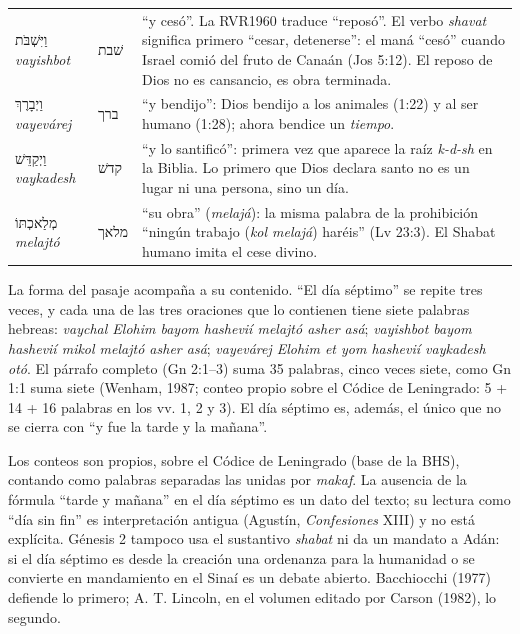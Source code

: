\documentclass[11pt,letterpaper]{article}
\newcommand{\heb}[1]{\mbox{\foreignlanguage{hebrew}{#1}}}
\begin{document}
\begin{filologia}[Gn 2:2--3]
\begin{tabular}{@{}L{3.1cm}L{1.5cm}L{10.2cm}@{}}
\heb{וַיִּשְׁבֹּת} \emph{vayishbot} & \heb{שׁבת} & ``y cesó''. La RVR1960 traduce ``reposó''. El verbo \emph{shavat} significa primero ``cesar, detenerse'': el maná ``cesó'' cuando Israel comió del fruto de Canaán (Jos 5:12). El reposo de Dios no es cansancio, es obra terminada. \\[2pt]
\heb{וַיְבָרֶךְ} \emph{vayevárej} & \heb{ברך} & ``y bendijo'': Dios bendijo a los animales (1:22) y al ser humano (1:28); ahora bendice un \emph{tiempo}. \\[2pt]
\heb{וַיְקַדֵּשׁ} \emph{vaykadesh} & \heb{קדשׁ} & ``y lo santificó'': primera vez que aparece la raíz \emph{k-d-sh} en la Biblia. Lo primero que Dios declara santo no es un lugar ni una persona, sino un día. \\[2pt]
\heb{מְלַאכְתּוֹ} \emph{melajtó} & \heb{מלאך} & ``su obra'' (\emph{melajá}): la misma palabra de la prohibición ``ningún trabajo (\emph{kol melajá}) haréis'' (Lv 23:3). El Shabat humano imita el cese divino. \\
\end{tabular}
\end{filologia}

La forma del pasaje acompaña a su contenido. ``El día séptimo'' se repite tres veces, y cada una de las tres oraciones que lo contienen tiene siete palabras hebreas: \emph{vaychal Elohim bayom hashevií melajtó asher asá}; \emph{vayishbot bayom hashevií mikol melajtó asher asá}; \emph{vayevárej Elohim et yom hashevií vaykadesh otó}. El párrafo completo (Gn 2:1--3) suma 35 palabras, cinco veces siete, como Gn 1:1 suma siete (Wenham, 1987; conteo propio sobre el Códice de Leningrado: 5 + 14 + 16 palabras en los vv. 1, 2 y 3). El día séptimo es, además, el único que no se cierra con ``y fue la tarde y la mañana''.

\begin{nota}[Precisión]
Los conteos son propios, sobre el Códice de Leningrado (base de la BHS), contando como palabras separadas las unidas por \emph{makaf}. La ausencia de la fórmula ``tarde y mañana'' en el día séptimo es un dato del texto; su lectura como ``día sin fin'' es interpretación antigua (Agustín, \emph{Confesiones} XIII) y no está explícita. Génesis 2 tampoco usa el sustantivo \emph{shabat} ni da un mandato a Adán: si el día séptimo es desde la creación una ordenanza para la humanidad o se convierte en mandamiento en el Sinaí es un debate abierto. Bacchiocchi (1977) defiende lo primero; A. T. Lincoln, en el volumen editado por Carson (1982), lo segundo.
\end{nota}
\end{document}
